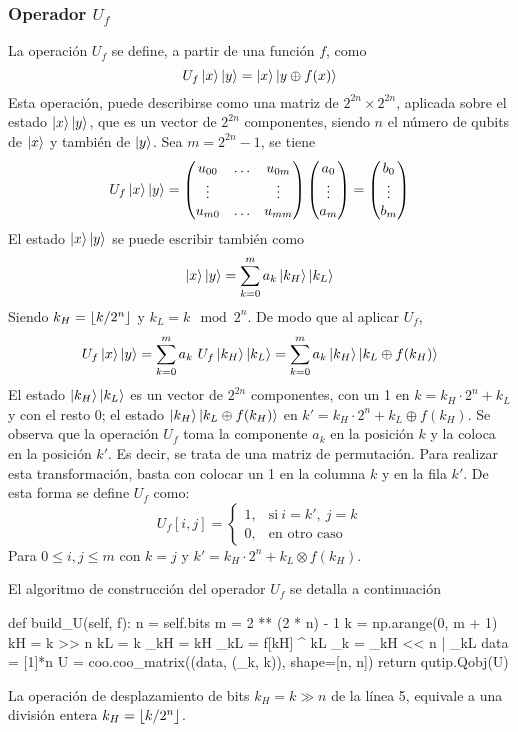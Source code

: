 \subsubsection{Operador $U_f$}
\noindent
La operación $U_f$ se define, a partir de una función $f$, como
$$ U_f \ket{x} \ket{y} = \ket{x} \ket{y \oplus f(x)} $$
Esta operación, puede describirse como una matriz de $2^{2n} \times 2^{2n}$,
aplicada sobre el estado $\ket{x} \ket{y}$, que es un vector de $2^{2n}$ 
componentes, siendo $n$ el número de qubits de $\ket x$ y también de $\ket y$.  
Sea $m = 2^{2n} -1$, se tiene
$$ U_f \ket x \ket y = \begin{pmatrix} 
	u_{00} & \ldots & u_{0m} \\
	\vdots &        & \vdots \\
	u_{m0} & \ldots & u_{mm} \\
 \end{pmatrix}
\begin{pmatrix} 
	a_{0} \\ \vdots \\ a_{m} \\
 \end{pmatrix}
=
\begin{pmatrix} 
	b_{0} \\ \vdots \\ b_{m} \\
 \end{pmatrix}
$$
El estado $\ket{x} \ket{y}$ se puede escribir también como
%
$$ \ket{x} \ket{y} = \sum_{k=0}^m a_k \ket{k_H}\ket{k_L} $$
%
%
Siendo $k_H = \lfloor k/2^n \rfloor$ y $k_L = k \mod 2^n$. De modo que al aplicar $U_f$,
%
$$ U_f \ket x \ket y = \sum_{k=0}^m a_k\ U_f \ket{k_H}\ket{k_L} =
\sum_{k=0}^m a_k \ket{k_H}\ket{k_L \oplus f(k_H)} $$
%
El estado $\ket{k_H} \ket{k_L}$ es un vector de $2^{2n}$ componentes, con un 1 
en $k = k_H \cdot 2^n + k_L$ y con el resto 0; el estado $\ket{k_H}\ket{k_L 
\oplus f(k_H)}$ en $k' = k_H \cdot 2^n + k_L \oplus f(k_H)$.  Se observa que la 
operación $U_f$ toma la componente $a_k$ en la posición $k$ y la coloca en la 
posición $k'$.  Es decir, se trata de una matriz de permutación. Para realizar 
esta transformación, basta con colocar un 1 en la columna $k$ y en la fila $k'$.  
De esta forma se define $U_f$ como:
%
\begin{equation*}
U_f[i,j] =
\begin{cases}
1, & \text{si}\ i = k',\ j = k \\
0, & \text{en otro caso}
\end{cases}
\end{equation*}
Para $0 \leq i,j \leq m$ con $k = j$ y $k' = k_H \cdot 2^n + k_L \otimes 
f(k_H)$.

%
%
\noindent
El algoritmo de construcción del operador $U_f$ se detalla a continuación
%
\begin{pycode}
def build_U(self, f):
	n = self.bits
	m = 2 ** (2 * n) - 1
	k = np.arange(0, m + 1)
	kH = k >> n
	kL = k %
	_kH = kH
	_kL = f[kH] ^ kL
	_k = _kH << n | _kL
	data = [1]*n
	U = coo.coo_matrix((data, (_k, k)), shape=[n, n])
	return qutip.Qobj(U)
\end{pycode}
%
La operación de desplazamiento de bits $k_H = k \gg n$ de la línea 5, equivale a 
una división entera $k_H = \lfloor k/2^n \rfloor$.

